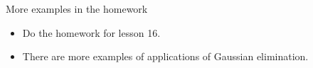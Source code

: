 \documentclass{beamer}
\begin{document}
\begin{frame}{More examples in the homework}
\begin{itemize}
\item Do the homework for lesson 16.
\item There are more examples of applications of Gaussian elimination.
\end{itemize}
\end{frame}
\end{document}
